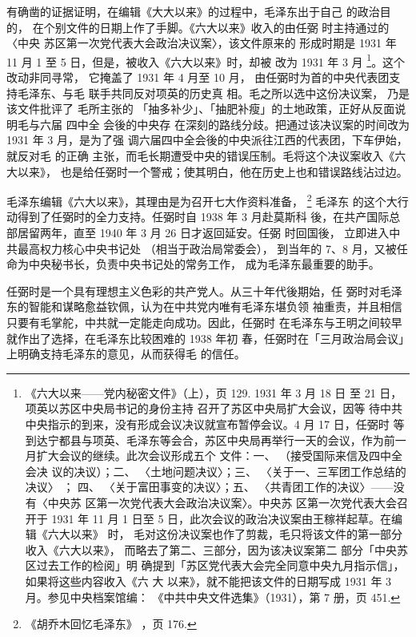 有确凿的证据证明，在编辑《大大以来》的过程中，毛泽东出于自己 的政治目的，
在个别文件的日期上作了手脚。《六大以来》收入的由任弼 时主持通过的〈中央
苏区第一次党代表大会政治决议案〉，该文件原来的 形成时期是 1931 年 11 月
1 至 5 日，但是，被收入《六大以来》时，却被 改为 1931 年 3 月
\footnote{《六大以来——党内秘密文件》（上），页 129. 1931 年 3 月 18 日
至 21 日，项英以苏区中央局书记的身份主持 召开了苏区中央局扩大会议，因等
待中共中央指示的到来，没有形成会议决议就宣布暂停会议。4 月 17 日，任弼时
等 到达宁都县与项英、毛泽东等会合，苏区中央局再举行一天的会议，作为前一
月扩大会议的继续。此次会议形成五个 文件：一、 （接受国际来信及四中全会决
议的决议）；二、 〈土地问题决议〉；三、 〈关于一、三军团工作总结的决议〉
； 四、 〈关于富田事变的决议〉；五、 〈共青团工作的决议〉——没有〈中央苏
区第一次党代表大会政治决议案〉。中央苏 区第一次党代表大会召开于 1931 年
11 月 1 日至 5 日，此次会议的政治决议案由王稼祥起草。在编辑《六大以来》
时， 毛对这份决议案也作了剪裁，毛只将该文件的第一部分收入《六大以来》，
而略去了第二、三部分，因为该决议案第二 部分「中央苏区过去工作的检阅」明
确提到「苏区党代表大会完全同意中央九月指示信」，如果将这些内容收入《六
大 以来》，就不能把该文件的日期写成 1931 年 3 月。参见中央档案馆编：
《中共中央文件选集》（1931），第 7 册，页 451.  }。这个改动非同寻常，
它掩盖了 1931 年 4 月至 10 月， 由任弼时为首的中央代表团支持毛泽东、与毛
联手共同反对项英的历史真 相。毛之所以选中这份决议案， 乃是该文件批评了
毛所主张的 「抽多补少」、「抽肥补瘦」的土地政策，正好从反面说明毛与六届
四中全 会後的中央存 在深刻的路线分歧。把通过该决议案的时间改为 1931 年 3
月，是为了强 调六届四中全会後的中央派往江西的代表团，下车伊始，就反对毛
的正确 主张，而毛长期遭受中央的错误压制。毛将这个决议案收入《六大以来》，
也是给任弼时一个警戒；使其明白，他在历史上也和错误路线沾过边。

毛泽东编辑《六大以来》，其理由是为召开七大作资料准备，
\footnote{《胡乔木回忆毛泽东》
，页 176.} 毛泽东
的这个大行动得到了任弼时的全力支持。任弼时自 1938 年 3 月赴莫斯科
後，在共产国际总部居留两年，直至 1940 年 3 月 26 日才返回延安。任弼
时回国後，
立即进入中共最高权力核心中央书记处
（相当于政治局常委会），
到当年的 7、8 月，又被任命为中央秘书长，负责中央书记处的常务工作，
成为毛泽东最重要的助手。

任弼时是一个具有理想主义色彩的共产党人。从三十年代後期始，任
弼时对毛泽东的智能和谋略愈益钦佩，认为在中共党内唯有毛泽东堪负领
袖重责，并且相信只要有毛掌舵，中共就一定能走向成功。因此，任弼时
在毛泽东与王明之间较早就作出了选择，在毛泽东比较困难的 1938 年初
春，任弼时在「三月政治局会议」上明确支持毛泽东的意见，从而获得毛
的信任。
 
